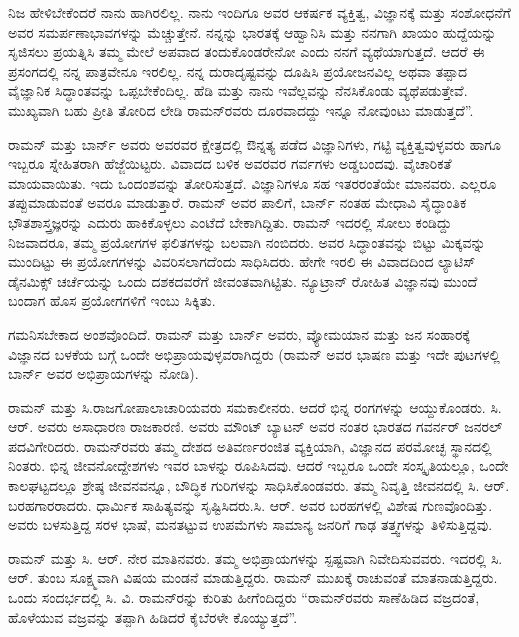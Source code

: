 ನಿಜ ಹೇಳಿಬೇಕೆಂದರೆ ನಾನು ಹಾಗಿರಲಿಲ್ಲ. ನಾನು ಇಂದಿಗೂ ಅವರ ಆಕರ್ಷಕ ವ್ಯಕ್ತಿತ್ವ, ವಿಜ್ಞಾನಕ್ಕೆ ಮತ್ತು ಸಂಶೋಧನೆಗೆ ಅವರ ಸಮರ್ಪಣಾಭಾವಗಳನ್ನು ಮೆಚ್ಚುತ್ತೇನೆ. ನನ್ನನ್ನು ಭಾರತಕ್ಕೆ ಆಹ್ವಾನಿಸಿ ಮತ್ತು ನನಗಾಗಿ ಖಾಯಂ ಹುದ್ದೆಯನ್ನು ಸೃಜಿಸಲು ಪ್ರಯತ್ನಿಸಿ ತಮ್ಮ ಮೇಲೆ ಅಪವಾದ ತಂದುಕೊಂಡರೇನೋ ಎಂದು ನನಗೆ ವ್ಯಥೆಯಾಗುತ್ತದೆ. ಆದರೆ ಈ ಪ್ರಸಂಗದಲ್ಲಿ ನನ್ನ ಪಾತ್ರವೇನೂ ಇರಲಿಲ್ಲ. ನನ್ನ ದುರಾದೃಷ್ಟವನ್ನು ದೂಷಿಸಿ ಪ್ರಯೋಜನವಿಲ್ಲ ಅಥವಾ ತಪ್ಪಾದ ವೈಜ್ಞಾನಿಕ ಸಿದ್ಧಾಂತವನ್ನು ಒಪ್ಪಬೇಕೆಂದಿಲ್ಲ. ಹೆಡಿ ಮತ್ತು ನಾನು ಇವೆಲ್ಲವನ್ನು ನೆನಸಿಕೊಂಡು ವ್ಯಥೆಪಡುತ್ತೇವೆ. ಮುಖ್ಯವಾಗಿ ಬಹು ಪ್ರೀತಿ ತೋರಿದ ಲೇಡಿ ರಾಮನ್‍ರವರು ದೂರವಾದದ್ದು ಇನ್ನೂ ನೋವುಂಟು ಮಾಡುತ್ತದೆ”.

ರಾಮನ್ ಮತ್ತು ಬಾರ್ನ್ ಅವರು ಅವರವರ ಕ್ಷೇತ್ರದಲ್ಲಿ ಔನ್ನತ್ಯ ಪಡೆದ ವಿಜ್ಞಾನಿಗಳು, ಗಟ್ಟಿ ವ್ಯಕ್ತಿತ್ವವುಳ್ಳವರು ಹಾಗೂ ಇಬ್ಬರೂ ಸ್ನೇಹಿತರಾಗಿ ಹೆಜ್ಜೆಯಿಟ್ಟರು. ವಿವಾದದ ಬಳಿಕ ಅವರವರ ಗರ್ವಗಳು ಅಡ್ಡಬಂದವು. ವೈಚಾರಿಕತೆ ಮಾಯವಾಯಿತು. ಇದು ಒಂದಂಶವನ್ನು ತೋರಿಸುತ್ತದೆ. ವಿಜ್ಞಾನಿಗಳೂ ಸಹ ಇತರರಂತೆಯೇ ಮಾನವರು. ಎಲ್ಲರೂ ತಪ್ಪುಮಾಡುವಂತೆ ಅವರೂ ಮಾಡುತ್ತಾರೆ. ರಾಮನ್ ಅವರ ಪಾಲಿಗೆ, ಬಾರ್ನ್ ನಂತಹ ಮೇಧಾವಿ ಸೈದ್ಧಾಂತಿಕ ಭೌತಶಾಸ್ತ್ರಜ್ಞರನ್ನು ಎದುರು ಹಾಕಿಕೊಳ್ಳಲು ಎಂಟೆದೆ ಬೇಕಾಗಿದ್ದಿತು. ರಾಮನ್ ಇದರಲ್ಲಿ ಸೋಲು ಕಂಡಿದ್ದು ನಿಜವಾದರೂ, ತಮ್ಮ ಪ್ರಯೋಗಗಳ ಫಲಿತಗಳನ್ನು ಬಲವಾಗಿ ನಂಬಿದರು. ಅವರ ಸಿದ್ಧಾಂತವನ್ನು ಬಿಟ್ಟು ಮಿಕ್ಕವನ್ನು ಮುಂದಿಟ್ಟು ಈ ಪ್ರಯೋಗಗಳನ್ನು ವಿವರಿಸಲಾಗದೆಂದು ಸಾಧಿಸಿದರು. ಹೇಗೇ ಇರಲಿ ಈ ವಿವಾದದಿಂದ ಲ್ಯಾಟಿಸ್ ಡೈನಮಿಕ್ಸ್ ಚರ್ಚೆಯನ್ನು ಒಂದು ದಶಕದವರೆಗೆ ಜೀವಂತವಾಗಿಟ್ಟಿತು. ನ್ಯೂಟ್ರಾನ್ ರೋಹಿತ ವಿಜ್ಞಾನವು ಮುಂದೆ ಬಂದಾಗ ಹೊಸ ಪ್ರಯೋಗಗಳಿಗೆ ಇಂಬು ಸಿಕ್ಕಿತು.

\newpage

ಗಮನಿಸಬೇಕಾದ ಅಂಶವೊಂದಿದೆ. ರಾಮನ್ ಮತ್ತು ಬಾರ್ನ್ ಅವರು, ವ್ಯೋಮಯಾನ ಮತ್ತು ಜನ ಸಂಹಾರಕ್ಕೆ ವಿಜ್ಞಾನದ ಬಳಕೆಯ ಬಗ್ಗೆ ಒಂದೇ ಅಭಿಪ್ರಾಯವುಳ್ಳವರಾಗಿದ್ದರು (ರಾಮನ್ ಅವರ ಭಾಷಣ ಮತ್ತು ಇದೇ ಪುಟಗಳಲ್ಲಿ ಬಾರ್ನ್ ಅವರ ಅಭಿಪ್ರಾಯಗಳನ್ನು ನೋಡಿ).



ರಾಮನ್ ಮತ್ತು ಸಿ.ರಾಜಗೋಪಾಲಾಚಾರಿಯವರು ಸಮಕಾಲೀನರು. ಆದರೆ ಭಿನ್ನ ರಂಗಗಳನ್ನು ಆಯ್ದುಕೊಂಡರು. ಸಿ. ಆರ್. ಅವರು ಅಸಾಧಾರಣ ರಾಜಕಾರಣಿ. ಅವರು ಮೌಂಟ್ ಬ್ಯಾಟನ್ ಅವರ ನಂತರ ಭಾರತದ ಗವರ್ನರ್ ಜನರಲ್ ಪದವಿಗೇರಿದರು. ರಾಮನ್‍ರವರು ತಮ್ಮ ದೇಶದ ಅತಿವರ್ಣರಂಜಿತ ವ್ಯಕ್ತಿಯಾಗಿ, ವಿಜ್ಞಾನದ ಪರಮೋಚ್ಛ ಸ್ಥಾನದಲ್ಲಿ ನಿಂತರು. ಭಿನ್ನ ಜೀವನೋದ್ದೇಶಗಳು ಇವರ ಬಾಳನ್ನು ರೂಪಿಸಿದವು. ಆದರೆ ಇಬ್ಬರೂ ಒಂದೇ ಸಂಸ್ಕೃತಿಯಲ್ಲೂ, ಒಂದೇ ಕಾಲಘಟ್ಟದಲ್ಲೂ ಶ್ರೇಷ್ಠ ಜೀವನವನ್ನೂ, ಬೌದ್ಧಿಕ ಗುರಿಗಳನ್ನು ಸಾಧಿಸಿಕೊಂಡವರು. ತಮ್ಮ ನಿವೃತ್ತಿ ಜೀವನದಲ್ಲಿ ಸಿ. ಆರ್. ಬರಹಗಾರರಾದರು. ಧಾರ್ಮಿಕ ಸಾಹಿತ್ಯವನ್ನು ಸೃಷ್ಟಿಸಿದರು.\break ಸಿ. ಆರ್. ಅವರ ಬರಹಗಳಲ್ಲಿ ವಿಶೇಷ ಗುಣವೊಂದಿತ್ತು. ಅವರು ಬಳಸುತ್ತಿದ್ದ ಸರಳ ಭಾಷೆ, ಮನತಟ್ಟುವ ಉಪಮೆಗಳು ಸಾಮಾನ್ಯ ಜನರಿಗೆ ಗಾಢ ತತ್ತ್ವಗಳನ್ನು ತಿಳಿಸುತ್ತಿದ್ದವು.

ರಾಮನ್ ಮತ್ತು ಸಿ. ಆರ್. ನೇರ ಮಾತಿನವರು. ತಮ್ಮ ಅಭಿಪ್ರಾಯಗಳನ್ನು ಸ್ಪಷ್ಟವಾಗಿ ನಿವೇದಿಸುವವರು. ಇದರಲ್ಲಿ ಸಿ. ಆರ್. ತುಂಬ ಸೂಕ್ಷ್ಮವಾಗಿ ವಿಷಯ ಮಂಡನೆ ಮಾಡುತ್ತಿದ್ದರು. ರಾಮನ್ ಮುಖಕ್ಕೆ ರಾಚುವಂತೆ ಮಾತನಾಡುತ್ತಿದ್ದರು. ಒಂದು ಸಂದರ್ಭದಲ್ಲಿ ಸಿ. ವಿ. ರಾಮನ್‍ರನ್ನು ಕುರಿತು ಹೀಗೆಂದಿದ್ದರು \enginline{--} “ರಾಮನ್‍ರವರು ಸಾಣೆಹಿಡಿದ ವಜ್ರದಂತೆ, ಹೊಳೆಯುವ ವಜ್ರವನ್ನು ತಪ್ಪಾಗಿ ಹಿಡಿದರೆ ಕೈಬೆರಳೇ ಕೊಯ್ಯುತ್ತದೆ”.

